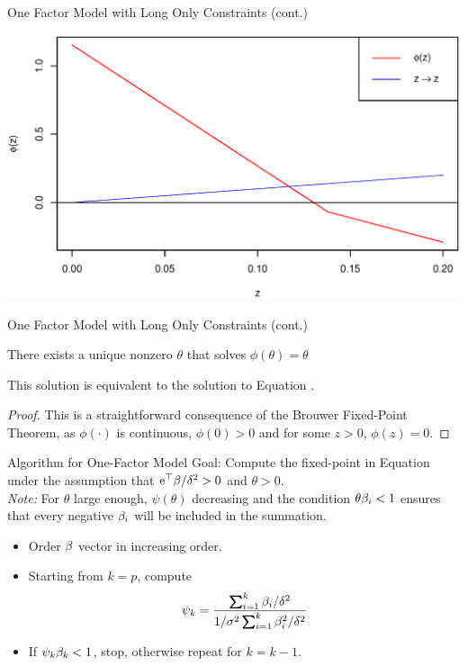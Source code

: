 \documentclass[11pt,leqno]{beamer}
\begin{document}
\begin{frame}{One Factor Model with Long Only Constraints (cont.)}
\begin{centering}
\includegraphics[scale=.5]{FP.eps}
\end{centering}
\end{frame}



\begin{frame}{One Factor Model with Long Only Constraints (cont.)}
\begin{theorem}
There exists a unique nonzero $\theta$ that solves $\phi(\theta)=\theta$
\end{theorem}
This solution is equivalent to the solution to Equation .
\begin{proof}
This is a straightforward consequence of the Brouwer Fixed-Point Theorem, as  $\phi(\cdot)$ is continuous, $\phi(0)>0$ and for some $z>0$, $\phi(z)=0$.
\end{proof}
\end{frame}

\begin{frame}{Algorithm for One-Factor Model}
Goal: Compute the fixed-point in Equation  under the assumption that $\mathrm{e}^\top \beta/\delta^2 >0$ and $\theta>0$.\\
\textit{Note:} For $\theta$ large enough, $\psi(\theta)$ decreasing and the condition $\theta \beta_i<1$ ensures that every negative $\beta_i$ will be included in the summation.
\begin{itemize}
\item Order $\beta$ vector in increasing order.
\item Starting from $k=p$, compute 
\begin{equation}
\psi_k = \frac{\sum_{i=1}^k\gb_i/\gd^2}{1/\gs^2 \sum_{i=1}^k \gb_i^2/\gd^2}
\end{equation}
\item If $\psi_k \beta_k < 1$, stop, otherwise repeat for $k=k-1$.
\end{itemize}
\end{frame}
\end{document}
